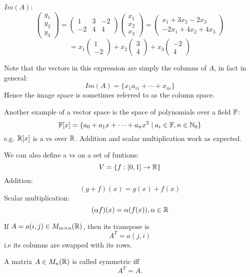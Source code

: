 \documentclass[a4paper,10pt]{article}
\begin{document}
\begin{ex}
	$Im(A)$:
	\[
		\begin{pmatrix}
			y_1 \\
			y_2 \\
			y_3
		\end{pmatrix}
		=
		\begin{pmatrix}
			1  & 3 & -2 \\
			-2 & 4 & 4
		\end{pmatrix}
		\begin{pmatrix}
			x_1 \\
			x_2 \\
			x_3
		\end{pmatrix}
		=
		\begin{pmatrix}
			x_1   + 3x_2 - 2x_3  \\
			-2x_1 + 4x_2 + 4x_3
		\end{pmatrix}
	\]
	\[
		= x_1
		\begin{pmatrix}
			1 \\
			-2
		\end{pmatrix}
		+ x_2
		\begin{pmatrix}
			3 \\
			4
		\end{pmatrix}
		+ x_3
		\begin{pmatrix}
			-2 \\
			4
		\end{pmatrix}
	\]

	Note that the vectors in this expression are simply the columns of $A$, in fact in general:
	\[ Im(A) = \{x_1a_{i1} + \cdots + x_{in}\} \]
	Hence the image space is sometimes referred to as the column space.
\end{ex}

Another example of a vector space is the space of polynomials over a field $\mathbb{F}$:
\[
	\mathbb{F}[x] =
	\{a_0 + a_1 x + \cdots + a_n x^2 \mid a_i \in \mathbb{F}, n \in \mathbb{N}_0\}
\]
e.g. $\mathbb{R}[x]$ is a vs over $\mathbb{R}$.
Addition and scalar multiplication work as expected.

We can also define a vs on a set of funtions:
\[
	V = \{f:[0,1] \to \mathbb{R}\}
\]
Addition:
\[
	(g+f)(x) = g(x) + f(x)
\]
Scalar multiplication:
\[
	(\alpha f)(x) = \alpha (f(x)), \alpha \in \mathbb{R}
\]


\begin{defn}[Transpose]
	If $A = a(i,j) \in M_{m \times n}(\mathbb{R})$, then its transpose is
	\[ A^T = a(j,i) \]
	i.e its columns are swapped with its rows.
\end{defn}
\begin{defn}[Symmetric]
	A matrix $A \in M_{n}(\mathbb{R})$ is called symmetric iff
	\[ A^T = A. \]
\end{defn}
\end{document}
